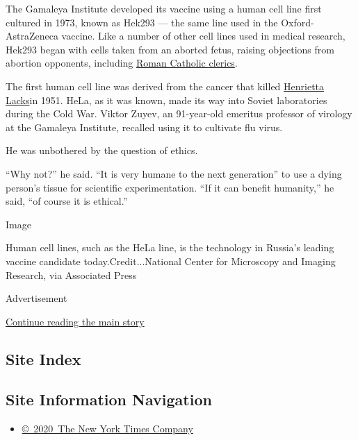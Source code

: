 The Gamaleya Institute developed its vaccine using a human cell line
first cultured in 1973, known as Hek293 --- the same line used in the
Oxford-AstraZeneca vaccine. Like a number of other cell lines used in
medical research, Hek293 began with cells taken from an aborted fetus,
raising objections from abortion opponents, including
\href{https://www.sciencemag.org/sites/default/files/Canada-COVID-19\%20Vaccine\%20letter\%20May\%2021st\%202020_updated\%20\%28002\%29.pdf}{Roman
Catholic clerics}.

The first human cell line was derived from the cancer that killed
\href{https://www.nytimes3xbfgragh.onion/2013/08/08/science/after-decades-of-research-henrietta-lacks-family-is-asked-for-consent.html}{Henrietta
Lacks}in 1951. HeLa, as it was known, made its way into Soviet
laboratories during the Cold War. Viktor Zuyev, an 91-year-old emeritus
professor of virology at the Gamaleya Institute, recalled using it to
cultivate flu virus.

He was unbothered by the question of ethics.

``Why not?'' he said. ``It is very humane to the next generation'' to
use a dying person's tissue for scientific experimentation. ``If it can
benefit humanity,'' he said, ``of course it is ethical.''

Image

Human cell lines, such as the HeLa line, is the technology in Russia's
leading vaccine candidate today.Credit...National Center for Microscopy
and Imaging Research, via Associated Press

Advertisement

\protect\hyperlink{after-bottom}{Continue reading the main story}

\hypertarget{site-index}{%
\subsection{Site Index}\label{site-index}}

\hypertarget{site-information-navigation}{%
\subsection{Site Information
Navigation}\label{site-information-navigation}}

\begin{itemize}
\tightlist
\item
  \href{https://help.nytimes3xbfgragh.onion/hc/en-us/articles/115014792127-Copyright-notice}{©~2020~The
  New York Times Company}
\end{itemize}

